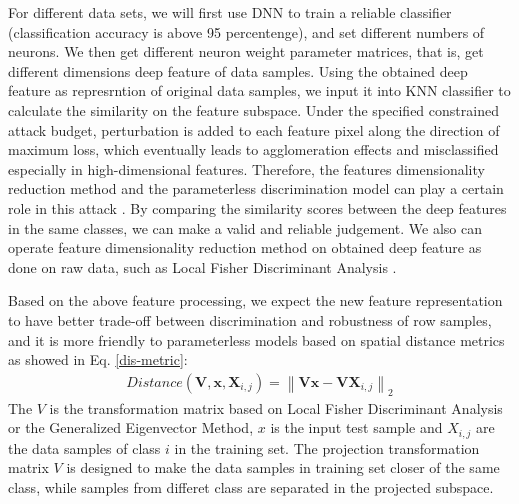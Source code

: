 \documentclass{ieeeaccess}
\begin{document}
For different data sets, we will first use DNN to train a reliable classifier (classification accuracy is above 95 percentenge), and set different numbers of neurons. We then get different neuron weight parameter matrices, that is, get different dimensions deep feature of data samples. Using the obtained deep feature as represrntion of original data samples, we input it into KNN classifier to calculate the similarity on the feature subspace. 
Under the specified constrained attack budget, perturbation is added to each feature pixel along the direction of maximum loss, which eventually leads to agglomeration effects and misclassified especially in high-dimensional features. 
Therefore, the features dimensionality reduction method and the parameterless discrimination model can play a certain role in this attack \cite{carrara2017detecting}.
By comparing the similarity scores between the deep features in the same classes, we can make a valid and reliable judgement. We also can operate feature dimensionality reduction method on obtained deep feature as done on raw data, such as Local Fisher Discriminant Analysis \cite{sugiyama2007dimensionality}.

Based on the above feature processing, we expect the new feature representation to have better trade-off between discrimination and robustness of row samples, and it is more friendly to parameterless models based on spatial distance metrics as showed in Eq. \ref{dis-metric}:
\begin{equation}
\begin{aligned}
Distance\left(\boldsymbol{V}, \boldsymbol{x}, \boldsymbol{X}_{i, j}\right)=\left\|\boldsymbol{V} \boldsymbol{x}-\boldsymbol{V} \boldsymbol{X}_{i, j}\right\|_{2}
\end{aligned}
\label{dis-metric}
\end{equation}
The $V$ is the transformation matrix based on Local Fisher Discriminant Analysis or the Generalized Eigenvector Method, $x$ is the input test sample and $X_{i,j}$ are the data samples of class $i$ in the training set. The projection transformation matrix $V$ is designed to make the data samples in training set closer of the same class, while samples from differet class are separated in the projected subspace. 
\end{document}
